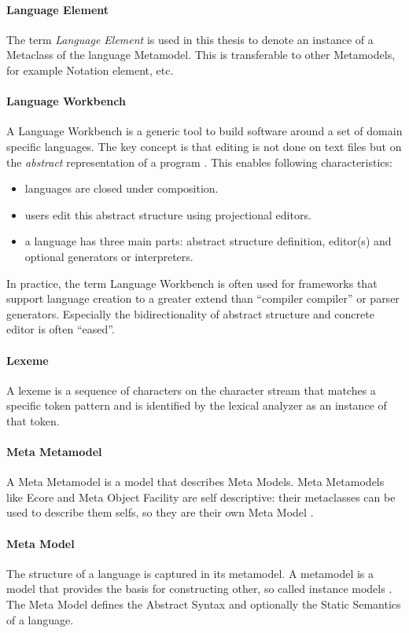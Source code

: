 \paragraph{Language Element} The term \emph{Language Element} is used in this thesis to denote an  instance of a Metaclass of the language Metamodel. This is transferable to other Metamodels, for example Notation element, etc.

\paragraph{Language Workbench}
A Language Workbench is a generic tool to build software around a set of domain specific languages. The key concept is that editing is not done on text files but on the \emph{abstract} representation of a program \cite{Fowler}. This enables following characteristics:
\begin{itemize}
	\item languages are closed under composition.
	\item users edit this abstract structure using projectional editors.
	\item a language has three main parts: abstract structure definition, editor(s) and optional generators or interpreters.
\end{itemize}
In practice, the term Language Workbench is often used for frameworks that support language creation to a greater extend than ``compiler compiler'' or parser generators. Especially the bidirectionality of abstract structure and concrete editor is often ``eased''. 

\paragraph{Lexeme}
A lexeme is a sequence of characters on the character stream that matches a specific token pattern and is identified by the lexical analyzer as an instance of that token. \cite{DragonBook}

\paragraph{Meta Metamodel} A Meta Metamodel is a model that describes Meta Models. Meta Metamodels like Ecore and Meta Object Facility are self descriptive: their metaclasses can be used to describe them selfs, so they are their own Meta Model \cite{EMF2nd}.

\paragraph{Meta Model} The structure of a language is captured in its metamodel. A metamodel is a model that provides the basis for constructing other, so called instance models \cite{EMP}. The Meta Model defines the Abstract Syntax and optionally the Static Semantics of a language. \cite{MDSD}

